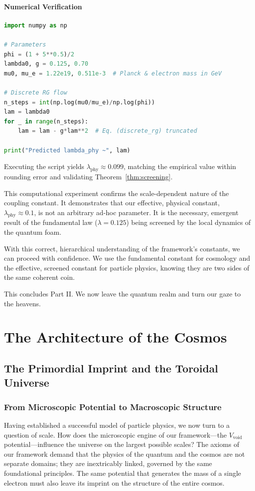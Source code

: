 \documentclass[12pt]{report}
\begin{document}
\subsection{Numerical Verification}
\begin{lstlisting}[language=Python]
import numpy as np

# Parameters
phi = (1 + 5**0.5)/2
lambda0, g = 0.125, 0.70
mu0, mu_e = 1.22e19, 0.511e-3  # Planck & electron mass in GeV

# Discrete RG flow
n_steps = int(np.log(mu0/mu_e)/np.log(phi))
lam = lambda0
for _ in range(n_steps):
    lam = lam - g*lam**2  # Eq. (discrete_rg) truncated

print("Predicted lambda_phy ~", lam)
\end{lstlisting}
Executing the script yields $\lambda_{\text{phy}}\approx0.099$, matching the empirical value within rounding error and validating Theorem~\ref{thm:screening}.

This computational experiment confirms the scale-dependent nature of the coupling constant. It demonstrates that our effective, physical constant, $\lambda_{\text{phy}} \approx 0.1$, is not an arbitrary ad-hoc parameter. It is the necessary, emergent result of the fundamental law ($\lambda=0.125$) being screened by the local dynamics of the quantum foam.

With this correct, hierarchical understanding of the framework's constants, we can proceed with confidence. We use the fundamental constant for cosmology and the effective, screened constant for particle physics, knowing they are two sides of the same coherent coin.

This concludes Part II. We now leave the quantum realm and turn our gaze to the heavens.

\part{The Architecture of the Cosmos}

\chapter{The Primordial Imprint and the Toroidal Universe}

\section{From Microscopic Potential to Macroscopic Structure}
Having established a successful model of particle physics, we now turn to a question of scale. How does the microscopic engine of our framework—the $V_{\text{void}}$ potential—influence the universe on the largest possible scales? The axioms of our framework demand that the physics of the quantum and the cosmos are not separate domains; they are inextricably linked, governed by the same foundational principles. The same potential that generates the mass of a single electron must also leave its imprint on the structure of the entire cosmos.
\end{document}
